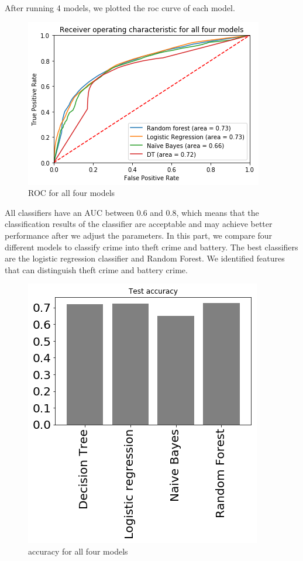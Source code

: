 \documentclass{article}
\begin{document}
After running 4 models, we plotted the roc curve of each model.

\begin{figure}[!h]
    \caption{ROC for all four models}
    \includegraphics[scale=0.9]{roc}
\end{figure}

All classifiers have an AUC between 0.6 and 0.8, which means that the classification results of the classifier are acceptable and may achieve better performance after we adjust the parameters. In this part, we compare four different models to classify crime into theft crime and battery. The best classifiers are the logistic regression classifier and Random Forest. We identified features that can distinguish theft crime and battery crime.

\begin{figure}[!h]
    \caption{accuracy for all four models}
    \includegraphics[scale=0.9]{acc}
\end{figure}
\end{document}

